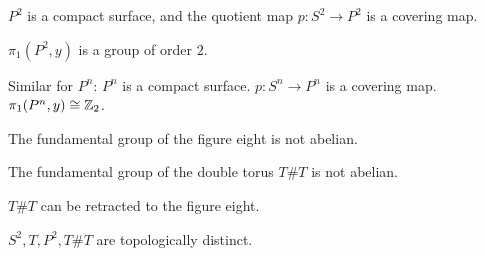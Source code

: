 \documentclass[12pt,a4paper]{article}
\begin{document}
    \begin{thm}
        $P^2$ is a compact surface, and the quotient map $p:S^2\to P^2$ is a covering map. 
    \end{thm}
    \begin{cor}
        $\pi_1(P^2,y)$ is a group of order $2$.
    \end{cor}
    \begin{remark}
        Similar for $P^n$: $P^n$ is a compact surface. $p:S^n\to P^n$ is a covering map. $\pi_1(P^n,y)\cong \mathbb{Z}_2$.
    \end{remark}
    \bigskip

    \begin{lemma}
        The fundamental group of the figure eight is not abelian.
    \end{lemma}
    \begin{thm}
        The fundamental group of the double torus $T\#T$ is not abelian.
    \end{thm}
    \begin{remark}
        $T\#T$ can be retracted to the figure eight.
    \end{remark}
    \begin{cor}
        $S^2,T,P^2,T\#T$ are topologically distinct.
    \end{cor}
    \bigskip

    \printglossary
    
\end{document}
